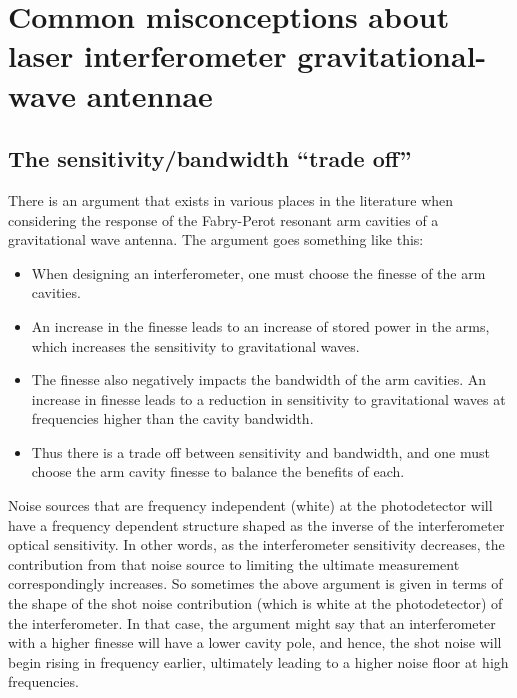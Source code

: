 \chapter{Common misconceptions about laser interferometer gravitational-wave antennae}

\section{The sensitivity/bandwidth ``trade off''}
There is an argument that exists in various places in the literature when considering the response of the Fabry-Perot resonant arm cavities of a gravitational wave antenna. %
The argument goes something like this:
\begin{itemize}
\item When designing an interferometer, one must choose the finesse of the arm cavities.
\item An increase in the finesse leads to an increase of stored power in the arms, which increases the sensitivity to gravitational waves.
\item The finesse also negatively impacts the bandwidth of the arm cavities. An increase in finesse leads to a reduction in sensitivity to gravitational waves at frequencies higher than the cavity bandwidth.
\item Thus there is a trade off between sensitivity and bandwidth, and one must choose the arm cavity finesse to balance the benefits of each.
\end{itemize}

Noise sources that are frequency independent (white) at the photodetector will have a frequency dependent structure shaped as the inverse of the interferometer optical sensitivity. %
In other words, as the interferometer sensitivity decreases, the contribution from that noise source to limiting the ultimate measurement correspondingly increases. %
So sometimes the above argument is given in terms of the shape of the shot noise contribution (which is white at the photodetector) of the interferometer. %
In that case, the argument might say that an interferometer with a higher finesse will have a lower cavity pole, and hence, the shot noise will begin rising in frequency earlier, ultimately leading to a higher noise floor at high frequencies.

